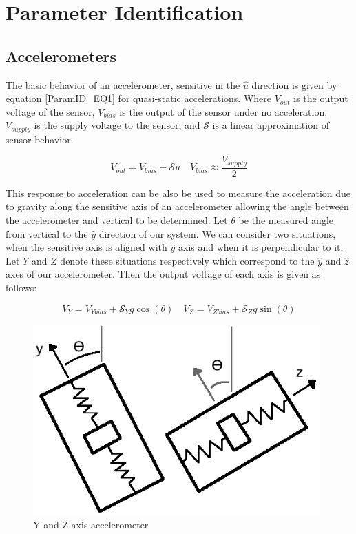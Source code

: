 \documentclass{article}
\theoremstyle{plain}
\theoremstyle{definition}
\theoremstyle{remark}
\newcommand{\Sens}{\mathcal{S}}
\begin{document}
\section{Parameter Identification}

\subsection*{Accelerometers}
The basic behavior of an accelerometer, sensitive in the $\hat{u}$ direction is given by equation \ref{ParamID_EQ1} for quasi-static accelerations.  Where $V_{out}$ is the output voltage of the sensor, $V_{bias}$ is the output of the sensor under no acceleration, $V_{supply}$ is the supply voltage to the sensor, and $\Sens$ is a linear approximation of sensor behavior.

\begin{equation}
V_{out} = V_{bias} + \Sens \ddot{u} \quad V_{bias} \approx \frac{V_{supply}}{2}
\label{ParamID_EQ1}
\end{equation}

This response to acceleration can be also be used to measure the acceleration due to gravity along the sensitive axis of an accelerometer allowing the angle between the accelerometer and vertical to be determined.  Let $\theta$ be the measured angle from vertical to the $\hat{y}$ direction of our system.  We can consider two situations, when the sensitive axis is aligned with $\hat{y}$ axis and when it is perpendicular to it.  Let $Y$ and $Z$ denote these situations respectively which correspond to the $\hat{y}$ and $\hat{z}$ axes of our accelerometer.  Then the output voltage of each axis is given as follows:

\begin{equation}
V_{Y} = V_{Ybias} + \Sens_{Y} g \cos(\theta) \quad V_{Z} = V_{Zbias} + \Sens_{Z} g \sin(\theta)
\label{ParamID_EQ2}
\end{equation}

\begin{figure}
\begin{center}
\includegraphics[width = 11cm]{Accelerometer_Cartoon.png}
\caption{Y and Z axis accelerometer}
\label{Accel_cartoon}
\end{center}
\end{figure}
\end{document}
